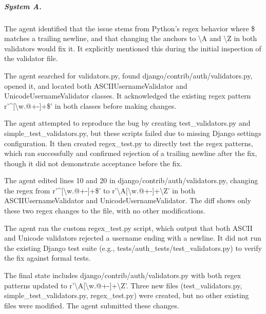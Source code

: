 \documentclass{article}
\begin{document}
\subparagraph{System A.}
\begin{description}[itemsep=1pt, topsep=2pt]\small
\item[understanding] The agent identified that the issue stems from Python's regex behavior where \$ matches a trailing newline, and that changing the anchors to \textbackslash{}A and \textbackslash{}Z in both validators would fix it. It explicitly mentioned this during the initial inspection of the validator file.
\item[localization] The agent searched for validators.py, found django/contrib/auth/validators.py, opened it, and located both ASCIIUsernameValidator and UnicodeUsernameValidator classes. It acknowledged the existing regex pattern r'\textasciicircum{}[\textbackslash{}w.@+-]+\$' in both classes before making changes.
\item[reproduction] The agent attempted to reproduce the bug by creating test\_validators.py and simple\_test\_validators.py, but these scripts failed due to missing Django settings configuration. It then created regex\_test.py to directly test the regex patterns, which ran successfully and confirmed rejection of a trailing newline after the fix, though it did not demonstrate acceptance before the fix.
\item[editing] The agent edited lines 10 and 20 in django/contrib/auth/validators.py, changing the regex from r'\textasciicircum{}[\textbackslash{}w.@+-]+\$' to r'\textbackslash{}A[\textbackslash{}w.@+-]+\textbackslash{}Z' in both ASCIIUsernameValidator and UnicodeUsernameValidator. The diff shows only these two regex changes to the file, with no other modifications.
\item[verification] The agent ran the custom regex\_test.py script, which output that both ASCII and Unicode validators rejected a username ending with a newline. It did not run the existing Django test suite (e.g., tests/auth\_tests/test\_validators.py) to verify the fix against formal tests.
\item[final state] The final state includes django/contrib/auth/validators.py with both regex patterns updated to r'\textbackslash{}A[\textbackslash{}w.@+-]+\textbackslash{}Z'. Three new files (test\_validators.py, simple\_test\_validators.py, regex\_test.py) were created, but no other existing files were modified. The agent submitted these changes.
\end{description}
\end{document}
